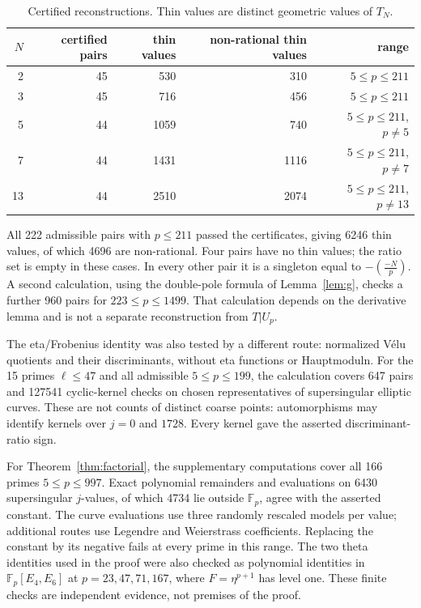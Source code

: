 \documentclass[11pt,a4paper]{article}
\numberwithin{equation}{section}
\theoremstyle{definition}
\theoremstyle{remark}
\newcommand{\Fp}{\mathbb F_p}
\begin{document}
\begin{table}[ht]\centering
\begin{tabular}{rrrrr}\toprule
$N$ & certified pairs & thin values & non-rational thin values & range\\\midrule
2 & 45 & 530 & 310 & $5\le p\le211$\\
3 & 45 & 716 & 456 & $5\le p\le211$\\
5 & 44 & 1059 & 740 & $5\le p\le211$, $p\ne5$\\
7 & 44 & 1431 & 1116 & $5\le p\le211$, $p\ne7$\\
13 & 44 & 2510 & 2074 & $5\le p\le211$, $p\ne13$\\\bottomrule
\end{tabular}
\caption{Certified reconstructions. Thin values are distinct geometric values of $T_N$.}
\end{table}

All 222 admissible pairs with $p\le211$ passed the certificates, giving 6246 thin
values, of which 4696 are non-rational. Four pairs have no thin values; the ratio
set is empty in these cases. In every other pair it is a singleton equal to
$-\left(\frac{-N}{p}\right)$. A second calculation, using the double-pole formula
of Lemma~\ref{lem:g}, checks a further 960 pairs for $223\le p\le1499$.
That calculation depends on the derivative lemma and is not a separate
reconstruction from $T|U_p$.

The eta/Frobenius identity was also tested by a different route: normalized
V\'elu quotients and their discriminants, without eta functions or Hauptmoduln.
For the 15 primes $\ell\le47$ and all admissible $5\le p\le199$, the calculation
covers 647 pairs and 127541 cyclic-kernel checks on chosen representatives of
supersingular elliptic curves. These are not counts of distinct coarse points:
automorphisms may identify kernels over $j=0$ and $1728$.
Every kernel gave the asserted discriminant-ratio sign.

For Theorem~\ref{thm:factorial}, the supplementary computations cover all
166 primes $5\le p\le997$. Exact polynomial remainders and evaluations
on 6430 supersingular $j$-values, of which 4734 lie outside $\Fp$, agree
with the asserted constant. The curve evaluations use three randomly
rescaled models per value; additional routes use Legendre and Weierstrass
coefficients. Replacing the constant by its negative fails at every prime
in this range. The two theta identities used in the proof were also
checked as polynomial identities in $\Fp[E_4,E_6]$ at
$p=23,47,71,167$, where $F=\eta^{p+1}$ has level one.
These finite checks are independent evidence, not premises of the proof.
\end{document}
